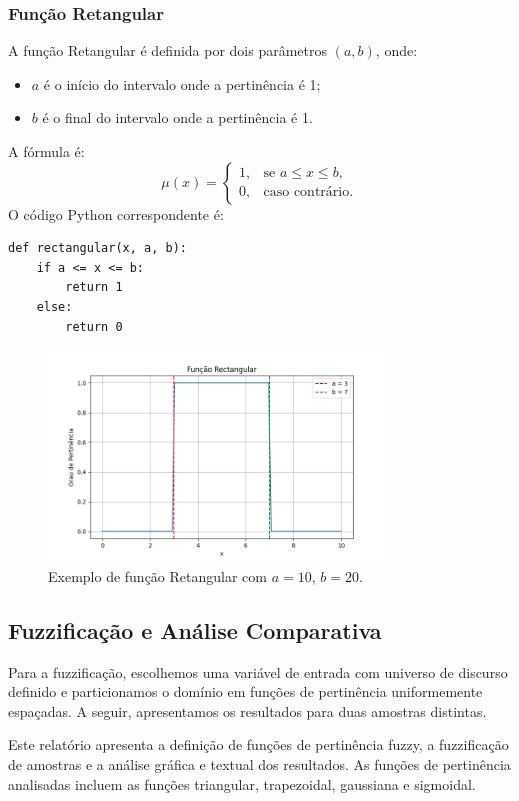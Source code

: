 \documentclass[a4paper,12pt]{article}
\begin{document}
\subsubsection{Função Retangular}
A função Retangular é definida por dois parâmetros $(a, b)$, onde:
\begin{itemize}
    \item $a$ é o início do intervalo onde a pertinência é 1;
    \item $b$ é o final do intervalo onde a pertinência é 1.
\end{itemize}
A fórmula é:
\[
\mu(x) =
\begin{cases}
1, & \text{se } a \leq x \leq b, \\
0, & \text{caso contrário.}
\end{cases}
\]
O código Python correspondente é:
\begin{verbatim}
def rectangular(x, a, b):
    if a <= x <= b:
        return 1
    else:
        return 0
\end{verbatim}
\begin{figure}[H]
    \centering
    \includegraphics[width=0.8\textwidth]{img/rectangular.png}
    \caption{Exemplo de função Retangular com $a=10$, $b=20$.}
\end{figure}

\subsection{Fuzzificação e Análise Comparativa}
Para a fuzzificação, escolhemos uma variável de entrada com universo de discurso definido e particionamos o domínio em funções de pertinência uniformemente espaçadas. A seguir, apresentamos os resultados para duas amostras distintas.

Este relatório apresenta a definição de funções de pertinência fuzzy, a fuzzificação de amostras e a análise gráfica e textual dos resultados. As funções de pertinência analisadas incluem as funções triangular, trapezoidal, gaussiana e sigmoidal.
\end{document}
